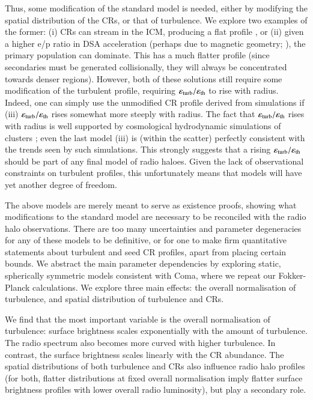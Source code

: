 \documentclass[fleqn,usenatbib,useAMS]{mnras}
\newcommand{\eps}{\varepsilon}
\begin{document}
Thus, some modification of the standard model is needed, either by modifying the spatial distribution of the CRs, or that of turbulence. We explore two examples of the former: (i) CRs can stream in the ICM, producing a flat profile \citep{ensslin11,wiener13}, or (ii) given a higher e/p ratio in DSA acceleration (perhaps due to magnetic geometry; \citealt{2014ApJ...794..153G}), the primary population can dominate. This has a much flatter profile (since secondaries must be generated collisionally, they will always be concentrated towards denser regions). However, both of these solutions still require some modification of the turbulent profile, requiring $\eps_{\rm turb}/\eps_{\rm th}$ to rise with radius. Indeed, one can simply use the unmodified CR profile derived from simulations if (iii) $\eps_{\rm turb}/\eps_{\rm th}$ rises somewhat more steeply with radius. The fact that $\eps_{\rm turb}/\eps_{\rm th}$ rises with radius is well supported by cosmological hydrodynamic simulations of clusters \citep{2009ApJ...705.1129L,2010ApJ...725.1452S,vazza11}; even the last model (iii) is (within the scatter) perfectly consistent with the trends seen by such simulations. This strongly suggests that a rising $\eps_{\rm turb}/\eps_{\rm th}$ should be part of any final model of radio haloes. Given the lack of observational constraints on turbulent profiles, this unfortunately means that models will have yet another degree of freedom. 

The above models are merely meant to serve as existence proofs, showing what
modifications to the standard model are necessary to be reconciled with the
radio halo observations. There are too many uncertainties and parameter
degeneracies for any of these models to be definitive, or for one to make firm
quantitative statements about turbulent and seed CR profiles, apart from placing
certain bounds. We abstract the main parameter dependencies by exploring static,
spherically symmetric models consistent with Coma, where we repeat our
Fokker-Planck calculations. We explore three main effects: the overall
normalisation of turbulence, and spatial distribution of turbulence and CRs.

We find that the most important variable is the overall normalisation of
turbulence: surface brightness scales exponentially with the amount of
turbulence. The radio spectrum also becomes more curved with higher
turbulence. In contrast, the surface brightness scales linearly with the CR
abundance.  The spatial distributions of both turbulence and CRs also influence
radio halo profiles (for both, flatter distributions at fixed overall
normalisation imply flatter surface brightness profiles with lower overall radio
luminosity), but play a secondary role.
\end{document}
